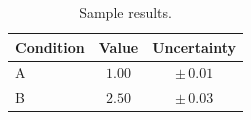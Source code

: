 \begin{table}[h]
  \centering
  \caption{Sample results.}
  \label{tab:sample}
  \begin{tabular}{lcc}
    \toprule
    Condition & Value & Uncertainty \\
    \midrule
    A & $1.00$ & $\pm\,0.01$ \\
    B & $2.50$ & $\pm\,0.03$ \\
    \bottomrule
  \end{tabular}
\end{table}
